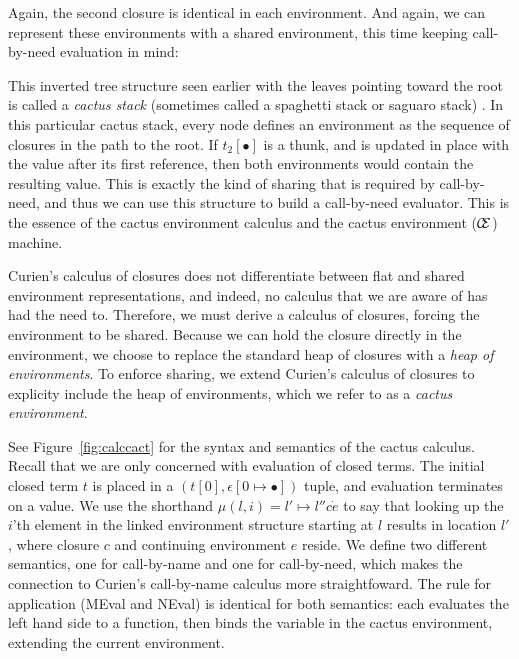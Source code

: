 Again, the second closure is identical in each environment.  And again,
we can represent these environments with a shared environment, this time
keeping call-by-need evaluation in mind:
\begin{center}
\end{center}
This inverted tree structure seen earlier with the leaves pointing toward the
root is called a \emph{cactus stack} (sometimes called a spaghetti stack or
saguaro stack) \cite{hauck1968burroughs,ichbiah1991rationale}. In this
particular cactus stack, every node defines an environment as the sequence of
closures in the path to the root.  If $t_2[\bullet]$ is a thunk, and is updated
in place with the value after its first reference, then both environments would
contain the resulting value. This is exactly the kind of sharing that is
required by call-by-need, and thus we can use this structure to build a
call-by-need evaluator. This is the essence of the cactus environment calculus
and the cactus environment ($\mathcal{\mathcal{C} \mskip -4mu \mathcal{E}}$) machine. 

Curien's calculus of closures does not differentiate between flat and shared
environment representations, and indeed, no calculus that we are aware of has
had the need to. Therefore, we must derive a calculus of closures, forcing the
environment to be shared. Because we can hold the closure directly in the
environment, we choose to replace the standard heap of closures with a
\emph{heap of environments}. To enforce sharing, we extend Curien's
calculus of closures to explicity include the heap of environments, which we
refer to as a \emph{cactus environment}. 

See Figure~\ref{fig:calccact} for the syntax and semantics of the cactus
calculus. Recall that we are only concerned with evaluation of closed terms. The
initial closed term $t$ is placed in a $(t[0],\epsilon[0 \mapsto \bullet])$ tuple, and
evaluation terminates on a value. We use the shorthand $\mu(l,i)=l' \mapsto l''
c \dot e$ to say that looking up the $i$'th element in the linked environment
structure starting at $l$ results in location $l'$, where closure $c$ and
continuing environment $e$ reside. We define two different semantics, one for
call-by-name and one for call-by-need, which makes the connection to
Curien's call-by-name calculus more straightfoward. The rule for application
(MEval and NEval) is identical for both semantics: each evaluates the left hand
side to a function, then binds the variable in the cactus environment, extending
the current environment.

